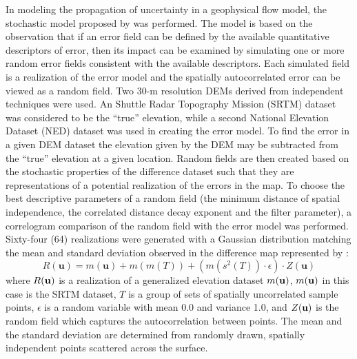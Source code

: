 \documentclass[a4paper,fleqn]{article}
\begin{document}
In modeling the propagation of uncertainty in a geophysical flow
model, the stochastic model proposed by \citet{Ehlschlaeger_1996} was
performed. The model is based on the observation that if an error
field can be defined by the available quantitative descriptors of
error, then its impact can be examined by simulating one or more
random error fields consistent with the available descriptors. Each
simulated field is a realization of the error model and the spatially
autocorrelated error can be viewed as a random field.
Two 30-m resolution DEMs derived from independent techniques were
used. An Shuttle Radar Topography Mission (SRTM) dataset was considered to be the ``true'' elevation,
while a second National Elevation Dataset (NED) dataset was used in creating the error model. To
find the error in a given DEM dataset the elevation given by the DEM
may be subtracted from the ``true'' elevation at a given
location. Random fields are then created based on the stochastic
properties of the difference dataset such that they are
representations of a potential realization of the errors in the map.
To choose the best descriptive parameters of a random field (the
minimum distance of spatial independence, the correlated distance
decay exponent and the filter parameter), a correlogram comparison of
the random field with the error model was performed. Sixty-four (64)
realizations were generated with a Gaussian distribution matching the
mean and standard deviation observed in the difference map represented
by \citep{Ehlschlaeger_1996}:
\begin{equation}
 R(\textbf{u})=m(\textbf{u})+m(m(T))+(m(s^2(T))\cdot \epsilon)\cdot Z(\textbf{u})
\label{eq:one}
\end{equation} 
where $R(\bf{u})$ is a realization of a generalized elevation dataset
$m(\bf{u})$,  $m(\bf{u})$ in this case is the SRTM dataset, $T$ is a group of sets
 of spatially uncorrelated sample
points, $\epsilon$ is a random variable with mean 0.0 and variance
1.0, and $Z(\bf{u})$ is the random field which captures the
autocorrelation between points.  The mean and the standard deviation
are determined from randomly drawn, spatially independent points
scattered across the surface.
\end{document}

